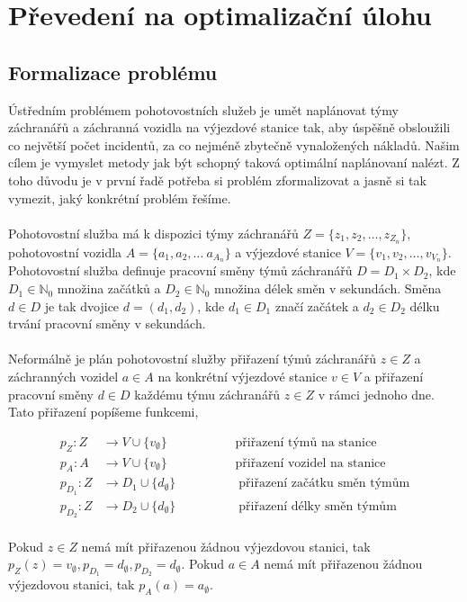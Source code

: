 \chapter{Převedení na optimalizační úlohu}

\section{Formalizace problému}

Ústředním problémem pohotovostních služeb je umět naplánovat týmy záchranářů a záchranná vozidla na výjezdové stanice tak, aby úspěšně obsloužili co největší počet incidentů,
za co nejméně zbytečně vynaložených nákladů.
Našim cílem je vymyslet metody jak být schopný taková optimální naplánovaní nalézt.
Z toho důvodu je v první řadě potřeba si problém zformalizovat a jasně si tak vymezit, jaký konkrétní problém řešíme.
\\
\\
Pohotovostní služba má k dispozici týmy záchranářů $Z = \{ z_1, z_2, \dots, z_{Z_n} \}$, pohotovostní vozidla $A = \{ a_1, a_2, \dots\ a_{A_n} \}$ a výjezdové stanice $V = \{ v_1, v_2, \dots, v_{V_n} \}$.
Pohotovostní služba definuje pracovní směny týmů záchranářů $D = D_{1} \times D_{2}$, 
kde $D_{1} \in \mathbb{N}_0$ množina začátků a $D_{2} \in \mathbb{N}_0$ množina délek směn v sekundách.
Směna $d \in D$ je tak dvojice $d = (d_1, d_2)$, kde $d_{1} \in D_{1}$ značí začátek a $d_{2} \in D_{2}$ délku trvání pracovní směny v sekundách.
\\
\\
Neformálně je plán pohotovostní služby přiřazení týmů záchranářů $z \in Z$ a záchranných vozidel $a \in A$ na konkrétní výjezdové stanice $v \in V$
a přiřazení pracovní směny $d \in D$ každému týmu záchranářů $z \in Z$ v rámci jednoho dne.
Tato přiřazení popíšeme funkcemi, 

\begin{definice}
  \begin{align}
    p_Z \colon Z &\rightarrow V \cup \{ v_{\emptyset} \}                   \hspace{65pt} \text{přiřazení týmů na stanice} \\
    p_A \colon A &\rightarrow V \cup \{ v_{\emptyset} \}                   \hspace{65pt} \text{přiřazení vozidel na stanice} \\ 
    p_{D_{1}} \colon Z &\rightarrow D_{1} \cup \{ d_{\emptyset} \}         \hspace{60pt} \text{přiřazení začátku směn týmům} \\
    p_{D_{2}} \colon Z &\rightarrow D_{2} \cup \{ d_{\emptyset} \}         \hspace{60pt} \text{přiřazení délky směn týmům}
  \end{align}
  \\
  Pokud $z \in Z$ nemá mít přiřazenou žádnou výjezdovou stanici,
  tak $p_{Z}(z) = v_{\emptyset}, p_{D_{1}} = d_{\emptyset}, p_{D_{2}} = d_{\emptyset}$.
  Pokud $a \in A$ nemá mít přiřazenou žádnou výjezdovou stanici, tak $p_{A}(a) = a_{\emptyset}$.
\end{definice}

